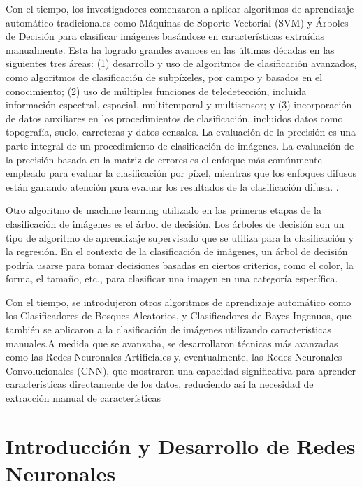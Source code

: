Con el tiempo, los investigadores comenzaron a aplicar algoritmos de aprendizaje automático tradicionales como Máquinas de Soporte Vectorial (SVM) y 
Árboles de Decisión para clasificar imágenes  
basándose en características extraídas manualmente. Esta ha logrado grandes avances en las últimas décadas en las siguientes tres áreas: (1) desarrollo y uso de algoritmos de clasificación avanzados, como algoritmos de clasificación de subpíxeles, por campo y basados en el conocimiento; (2) uso de múltiples funciones de teledetección, incluida información espectral, espacial, multitemporal y multisensor; y (3) incorporación de datos auxiliares en los procedimientos de clasificación, incluidos datos como topografía, suelo, carreteras y datos censales. La evaluación de la precisión es una parte integral de un procedimiento de clasificación de imágenes. La evaluación de la precisión basada en la matriz de errores es el enfoque más comúnmente empleado para evaluar la clasificación por píxel, mientras que los enfoques difusos están ganando atención para evaluar los resultados de la clasificación difusa. .

Otro algoritmo de machine learning utilizado en las primeras etapas de la clasificación de imágenes es el árbol de decisión. Los árboles de decisión son un tipo de algoritmo de aprendizaje supervisado que se utiliza para la clasificación y la regresión. En el contexto de la clasificación de imágenes, un árbol de decisión podría usarse para tomar decisiones basadas en ciertos criterios, como el color, la forma, el tamaño, etc., para clasificar una imagen en una categoría específica.

Con el tiempo, se introdujeron otros algoritmos de aprendizaje automático como los Clasificadores de Bosques Aleatorios, y Clasificadores de Bayes Ingenuos, que 
también se aplicaron a la clasificación de imágenes utilizando características manuales.A medida que se avanzaba, se desarrollaron técnicas más avanzadas como las Redes Neuronales Artificiales y, eventualmente, las Redes Neuronales Convolucionales (CNN), que mostraron una capacidad significativa para aprender características directamente de los datos, reduciendo así la necesidad de extracción manual de características 

\section*{Introducción y Desarrollo de Redes Neuronales}


